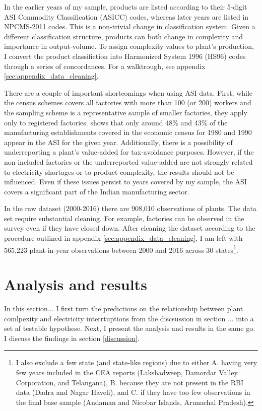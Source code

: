 \documentclass[11pt]{article}
\begin{document}
In the earlier years of my sample, products are listed according to their 5-digit ASI Commodity Classification (ASICC) codes, whereas later years are listed in NPCMS-2011 codes. This is a non-trivial change in classification system. Given a different classification structure, products can both change in complexity and importance in output-volume. To assign complexity values to plant's production, I convert the product classifiction into Harmonized System 1996 (HS96) codes through a series of concordances. For a walktrough, see appendix \ref{sec:appendix_data_cleaning}.

There are a couple of important shortcomings when using ASI data. First, while the census schemes covers all factories with more than 100 (or 200) workers and the sampling scheme is a representative sample of smaller factories, they apply only to registered factories. \cite{nagaraj_how_2002} shows that only around 48\% and 43\% of the manufacturing establishments covered in the economic census for 1980 and 1990 appear in the ASI for the given year. Additionally, there is a possibility of underreporting a plant's value-added for tax-avoidance purposes. However, if the non-included factories or the underreported value-added are not strongly related to electricity shortages or to product complexity, the results should not be influenced. Even if these issues persist to years covered by my sample, the ASI covers a significant part of the Indian manufacturing sector.

In the raw dataset (2000-2016) there are 908,010 observations of plants. The data set require substantial cleaning. For example, factories can be observed in the survey even if they have closed down. After cleaning the dataset according to the procedure outlined in appendix \ref{sec:appendix_data_cleaning}, I am left with 565,223 plant-in-year observations between 2000 and 2016 across 30 states\footnote{I also exclude a few state (and state-like regions) due to either A. having very few years included in the CEA reports (Lakshadweep, Damordar Valley Corporation, and Telangana), B. because they are not present in the RBI data (Dadra and Nagar Haveli), and C. if they have too few observations in the final base sample (Andaman and Nicobar Islands, Arunachal Pradesh).}.

\newpage

\section{Analysis and results}%
\label{sec:analysis_and_results}
 In this section... I first turn the predictions on the relationship between plant comlpexity and electricity interrtuptions from the discsussion in section ... into a set af testable hypothese. Next, I present the analysis and results in the same go. I discuss the findings in section \ref{discussion}.
\end{document}
